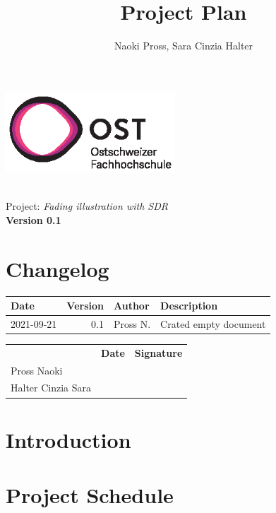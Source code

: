 \documentclass[a4paper, twosided, 11pt]{scrartcl}
\title{Project Plan}
\author{Naoki Pross, Sara Cinzia Halter}
\begin{document}
\begin{titlepage}
  \includegraphics[height=3cm]{fig/ost-logo}
  \begin{flushright}
    \vspace{5cm}
    {\Huge \bfseries \thetitle} \\
    \vspace{5mm}
    {\LARGE Project: \textit{Fading illustration with SDR}} \\
    \vspace{5mm}
    {\LARGE \bfseries Version 0.1}
  \end{flushright}
\end{titlepage}

\section*{Changelog}
\begin{tabularx}{\textwidth}{lrlX}
  \toprule
  \bfseries Date & \bfseries Version & \bfseries Author & \bfseries Description \\
  \midrule
  2021-09-21 & 0.1 & Pross N.  & Crated empty document \\
  \bottomrule
\end{tabularx}

\vfill
{
  \renewcommand{\arraystretch}{2}
  \begin{tabularx}{\textwidth}{lp{}X}
                       & \bfseries Date & \bfseries Signature\\
    Pross Naoki        & \hrulefill & \hrulefill \\
    Halter Cinzia Sara & \hrulefill & \hrulefill \\
  \end{tabularx}
}

\clearpage
\tableofcontents
\listoffigures
\listoftables
\clearpage

\section{Introduction}

\section{Project Schedule}
\end{document}
